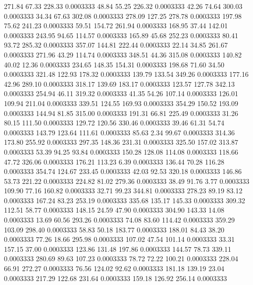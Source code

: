 271.84   67.33  228.33   0.0003333
  48.84   55.25  226.32   0.0003333
  42.26   74.64  300.03   0.0003333
  34.34   67.63  302.08   0.0003333
 278.09  127.25  278.78   0.0003333
 197.98   75.62  241.23   0.0003333
  59.51  154.72  261.94   0.0003333
 168.95   37.44  142.01   0.0003333
 243.95   94.65  114.57   0.0003333
 165.89   45.68  252.23   0.0003333
  80.41   93.72  285.32   0.0003333
 357.07  144.81  222.44   0.0003333
  22.14   34.85  261.67   0.0003333
 271.96   43.29  114.74   0.0003333
 348.51   44.36  315.08   0.0003333
 140.82   40.02   12.36   0.0003333
 234.65  148.35  154.31   0.0003333
 198.68   71.60   34.50   0.0003333
 321.48  122.93  178.32   0.0003333
 139.79  133.54  349.26   0.0003333
 177.16   42.96  289.10   0.0003333
 318.17  139.69  183.17   0.0003333
 123.57  127.78  342.13   0.0003333
 254.94   46.11  319.32   0.0003333
  41.35   54.26  107.14   0.0003333
 126.01  109.94  211.04   0.0003333
 339.51  124.55  169.93   0.0003333
 354.29  150.52  193.09   0.0003333
 144.94   81.85  315.00   0.0003333
 191.31   66.81  225.49   0.0003333
  31.26   80.15  111.50   0.0003333
 129.72  120.56  330.46   0.0003333
  39.46   61.31   54.74   0.0003333
 143.79  123.64  111.61   0.0003333
  85.63    2.34   99.67   0.0003333
 314.36  173.80  255.92   0.0003333
 297.35  148.36  231.31   0.0003333
 325.50  157.02  313.87   0.0003333
  53.39   94.25   93.84   0.0003333
 150.28  128.08  114.08   0.0003333
 118.66   47.72  326.06   0.0003333
 176.21  113.23    6.39   0.0003333
 136.44   70.28  116.28   0.0003333
 354.74  124.67  233.45   0.0003333
  42.03   92.53  320.18   0.0003333
 146.86   53.73  221.22   0.0003333
 224.82   81.02  279.36   0.0003333
  38.49   91.76    3.77   0.0003333
 109.90   77.16  160.82   0.0003333
  32.71   99.23  344.81   0.0003333
 278.23   89.19   83.12   0.0003333
 167.24   83.23  253.19   0.0003333
 335.68  135.17  145.33   0.0003333
 309.32  112.51   58.77   0.0003333
 148.15   24.59   47.90   0.0003333
 304.90  143.33   14.08   0.0003333
  13.69   60.56  293.26   0.0003333
  74.08   83.60  114.42   0.0003333
 359.29  103.09  298.40   0.0003333
  58.83   50.18  183.77   0.0003333
 188.01   84.43   38.20   0.0003333
  77.26   18.66  295.98   0.0003333
 107.02   47.54  101.14   0.0003333
  33.31  157.15   37.00   0.0003333
 123.86  131.48  197.86   0.0003333
 144.57   78.73  339.11   0.0003333
 280.69   89.63  107.23   0.0003333
  78.72   72.22  100.21   0.0003333
 228.04   66.91  272.27   0.0003333
  76.56  124.02   92.62   0.0003333
 181.18  139.19   23.04   0.0003333
 217.29  122.68  231.64   0.0003333
 159.18  126.92  256.14   0.0003333
